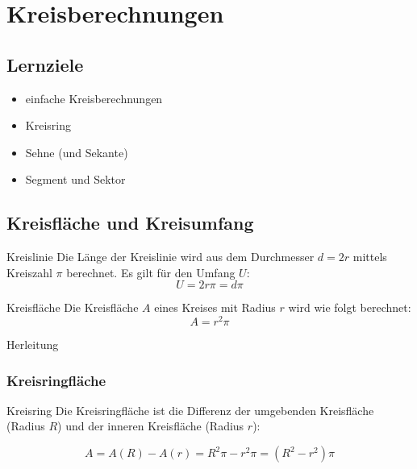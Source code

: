 
\section{Kreisberechnungen}


\subsection*{Lernziele}

\begin{itemize}
\item einfache Kreisberechnungen
\item Kreisring
\item Sehne (und Sekante)
\item Segment und Sektor
\end{itemize}

\newpage


\subsection{Kreisfläche und Kreisumfang}

\begin{gesetz}{Kreislinie}{}\index{$\pi$}
  Die Länge der Kreislinie wird aus dem Durchmesser $d=2r$  mittels Kreiszahl
  $\pi$ berechnet. Es gilt für den Umfang $U$:
  $$U = 2r\pi = d\pi$$
\end{gesetz}

\begin{gesetz}{Kreisfläche}{}
  Die Kreisfläche $A$ eines Kreises mit Radius $r$ wird wie folgt
  berechnet:
  $$A = r^2\pi$$
\end{gesetz}
Herleitung

\subsubsection{Kreisringfläche}
\begin{gesetz}{Kreisring}{}
  Die Kreisringfläche ist die Differenz der umgebenden Kreisfläche
  (Radius $R$) und
  der inneren Kreisfläche (Radius $r$):

  $$A = A(R) - A(r) = R^2\pi - r^2\pi = (R^2-r^2)\pi$$
\end{gesetz}


